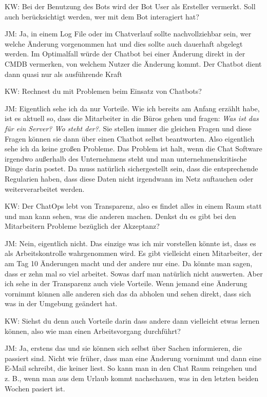 \begin{list}{X:}{\setlength{\labelsep}{5mm}}
\item[KW:] Bei der Benutzung des Bots wird der Bot User als Ersteller vermerkt. Soll auch berücksichtigt werden, wer mit dem Bot interagiert hat?
\item[JM:] Ja, in einem Log File oder im Chatverlauf sollte nachvollziehbar sein, wer welche Änderung vorgenommen hat und dies sollte auch dauerhaft abgelegt werden. Im Optimalfall würde der Chatbot bei einer Änderung direkt in der CMDB vermerken, von welchem Nutzer die Änderung kommt. Der Chatbot dient dann quasi nur als ausführende Kraft
\item[KW:] Rechnest du mit Problemen beim Einsatz von Chatbots?
\item[JM:] Eigentlich sehe ich da nur Vorteile. Wie ich bereits am Anfang erzählt habe, ist es aktuell so, dass die Mitarbeiter in die Büros gehen und fragen: \textit{Was ist das für ein Server? Wo steht der?}. Sie stellen immer die gleichen Fragen und diese Fragen können sie dann über einen Chatbot selbst beantworten. Also eigentlich sehe ich da keine großen Probleme. Das Problem ist halt, wenn die Chat Software irgendwo außerhalb des Unternehmens steht und man unternehmenskritische Dinge darin postet. Da muss natürlich sichergestellt sein, dass die entsprechende Regularien haben, dass diese Daten nicht irgendwann im Netz auftauchen oder weiterverarbeitet werden.
\item[KW:] Der ChatOps lebt von Transparenz, also es findet alles in einem Raum statt und man kann sehen, was die anderen machen. Denkst du es gibt bei den Mitarbeitern Probleme bezüglich der Akzeptanz?
\item[JM:] Nein, eigentlich nicht. Das einzige was ich mir vorstellen könnte ist, dass es als Arbeitskontrolle wahrgenommen wird. Es gibt vielleicht einen Mitarbeiter, der am Tag 10 Änderungen macht und der andere nur eine. Da könnte man sagen, dass er zehn mal so viel arbeitet. Sowas darf man natürlich nicht auswerten. Aber ich sehe in der Transparenz auch viele Vorteile. Wenn jemand eine Änderung vornimmt können alle anderen sich das da abholen und sehen direkt, dass sich was in der Umgebung geändert hat. 
\item[KW:] Siehst du denn auch Vorteile darin dass andere dann vielleicht etwas lernen können, also wie man einen Arbeitsvorgang durchführt?
\item[JM:] Ja, erstens das und sie können sich selbst über Sachen informieren, die passiert sind. Nicht wie früher, dass man eine Änderung vornimmt und dann eine E-Mail schreibt, die keiner liest. So kann man in den Chat Raum reingehen und z. B., wenn man aus dem Urlaub kommt nachschauen, was in den letzten beiden Wochen pasiert ist.

\end{list}
